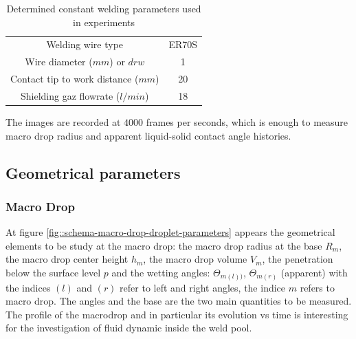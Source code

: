 \documentclass[12pt]{iopart}
\begin{document}
\begin{table}
\begin{center}
\begin{tabular}{|cc|}
\hline
Welding wire type & ER70S \\ 
Wire diameter ($mm$) or $drw$ & 1 \\  
Contact tip to work distance ($mm$) & 20 \\
Shielding gaz flowrate ($l/min$) & 18 \\ \hline
\end{tabular}
\caption{{\small Determined constant welding parameters used in experiments}}
\label{table-parameters-static}
\end{center}
\end{table}



The images are recorded at $4000$ frames per seconds, which is enough to
measure macro drop radius and apparent liquid-solid contact angle histories. 

      
      
\subsection{Geometrical parameters}
\label{system_definitions}
\subsubsection{ Macro Drop}
\label{ macro_drop}


At figure \ref{fig::schema-macro-drop-droplet-parameters} appears the geometrical 
elements to be study at the macro drop: the macro drop radius at the base $R_{m}$, 
the macro drop center height $h_{m}$, the macro drop volume $V_{m}$, the
penetration below the surface level $p$ and the wetting angles:
$\Theta_{m(l))}$, $\Theta_{m(r)}$ (apparent) 
with the indices $(l)$ and $(r)$ refer to left and
right angles, the indice  $m$ refers to macro drop.
The angles and the base are the two main quantities to be measured.
The profile of the macrodrop and in particular its evolution vs time is
interesting for the investigation of fluid dynamic inside the weld pool.
\end{document}
